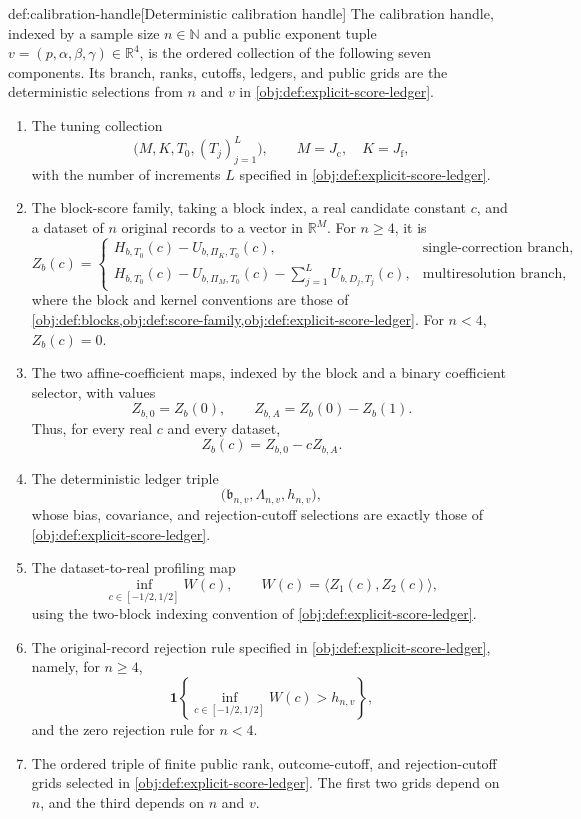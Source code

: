 \documentclass[11pt]{article}
\begin{document}
\begin{algorithmv}{def:calibration-handle}[Deterministic calibration handle]
The calibration handle, indexed by a sample size \(n\in\mathbb N\) and a public exponent tuple \(v=(p,\alpha,\beta,\gamma)\in\mathbb R^4\), is the ordered collection of the following seven components. Its branch, ranks, cutoffs, ledgers, and public grids are the deterministic selections from \(n\) and \(v\) in \cref{obj:def:explicit-score-ledger}.

\begin{enumerate}
\item The tuning collection
\[
\bigl(M,K,T_0,(T_j)_{j=1}^{L}\bigr),
\qquad M=J_{\mathrm c},\quad K=J_{\mathrm f},
\]
with the number of increments \(L\) specified in \cref{obj:def:explicit-score-ledger}.

\item The block-score family, taking a block index, a real candidate constant \(c\), and a dataset of \(n\) original records to a vector in \(\mathbb R^M\). For \(n\ge4\), it is
\[
Z_b(c)=
\begin{cases}
H_{b,T_0}(c)-U_{b,\Pi_K,T_0}(c),
&\text{single-correction branch},\\[1mm]
H_{b,T_0}(c)-U_{b,\Pi_M,T_0}(c)
-\displaystyle\sum_{j=1}^{L}U_{b,D_j,T_j}(c),
&\text{multiresolution branch},
\end{cases}
\]
where the block and kernel conventions are those of
\cref{obj:def:blocks,obj:def:score-family,obj:def:explicit-score-ledger}.
For \(n<4\), \(Z_b(c)=0\).

\item The two affine-coefficient maps, indexed by the block and a binary coefficient selector, with values
\[
Z_{b,0}=Z_b(0),
\qquad
Z_{b,A}=Z_b(0)-Z_b(1).
\]
Thus, for every real \(c\) and every dataset,
\[
Z_b(c)=Z_{b,0}-cZ_{b,A}.
\]

\item The deterministic ledger triple
\[
\bigl(\mathfrak b_{n,v},\Lambda_{n,v},h_{n,v}\bigr),
\]
whose bias, covariance, and rejection-cutoff selections are exactly those of
\cref{obj:def:explicit-score-ledger}.

\item The dataset-to-real profiling map
\[
\inf_{c\in[-1/2,1/2]}W(c),
\qquad
W(c)=\langle Z_1(c),Z_2(c)\rangle,
\]
using the two-block indexing convention of
\cref{obj:def:explicit-score-ledger}.

\item The original-record rejection rule specified in
\cref{obj:def:explicit-score-ledger}, namely, for \(n\ge4\),
\[
\mathbf 1\!\left\{
\inf_{c\in[-1/2,1/2]}W(c)>h_{n,v}
\right\},
\]
and the zero rejection rule for \(n<4\).

\item The ordered triple of finite public rank, outcome-cutoff, and rejection-cutoff grids selected in \cref{obj:def:explicit-score-ledger}. The first two grids depend on \(n\), and the third depends on \(n\) and \(v\).
\end{enumerate}
\end{algorithmv}
\end{document}
